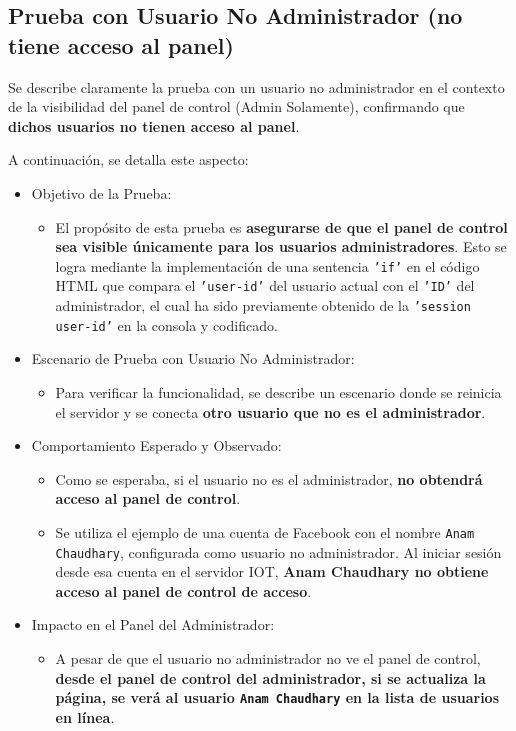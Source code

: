 \documentclass{report}
\begin{document}
\subsection{Prueba con Usuario No Administrador (no tiene acceso al panel)}
Se describe claramente la prueba con un usuario no administrador en el contexto de la visibilidad del panel de control (Admin Solamente), 
confirmando que \textbf{dichos usuarios no tienen acceso al panel}.

A continuación, se detalla este aspecto:
\begin{itemize}
    \item Objetivo de la Prueba:
    \begin{itemize}
        \item El propósito de esta prueba es \textbf{asegurarse de que el panel de control sea visible únicamente para los usuarios 
              administradores}. Esto se logra mediante la implementación de una sentencia \texttt{'if'} en el código HTML que compara el \texttt{'user-id'}
              del usuario actual con el \texttt{'ID'} del administrador, el cual ha sido previamente obtenido de la \texttt{'session user-id'} en la consola
              y codificado.
    \end{itemize}

    \item Escenario de Prueba con Usuario No Administrador:
    \begin{itemize}
        \item Para verificar la funcionalidad, se describe un escenario donde se reinicia el servidor y se conecta \textbf{otro usuario que no es el 
              administrador}.
    \end{itemize}

    \item Comportamiento Esperado y Observado:
    \begin{itemize}
        \item Como se esperaba, si el usuario no es el administrador, \textbf{no obtendrá acceso al panel de control}.
        \item Se utiliza el ejemplo de una cuenta de Facebook con el nombre \texttt{Anam Chaudhary}, configurada como usuario no administrador. 
              Al iniciar sesión desde esa cuenta en el servidor IOT, \textbf{Anam Chaudhary no obtiene acceso al panel de control de acceso}.
    \end{itemize}

    \item Impacto en el Panel del Administrador:
    \begin{itemize}
        \item A pesar de que el usuario no administrador no ve el panel de control, \textbf{desde el panel de control del administrador, si se actualiza 
              la página, se verá al usuario \texttt{Anam Chaudhary} en la lista de usuarios en línea}.    
    \end{itemize}
    

\end{itemize}
\end{document}
